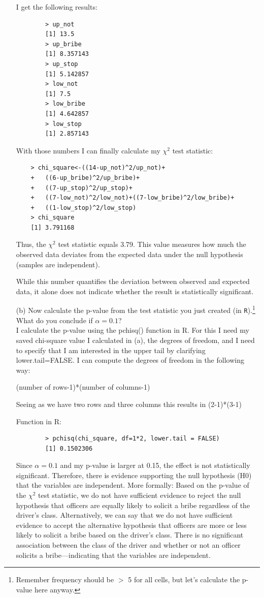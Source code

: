 \documentclass[12pt,letterpaper]{article}
\begin{document}
\begin{enumerate}
	I get the following results: 
	\begin{verbatim}
		> up_not
		[1] 13.5
		> up_bribe
		[1] 8.357143
		> up_stop
		[1] 5.142857
		> low_not
		[1] 7.5
		> low_bribe
		[1] 4.642857
		> low_stop
		[1] 2.857143
		\end{verbatim}
	
	With those numbers I can finally calculate my $\chi^2$ test statistic:
	\begin{verbatim}	
	> chi_square<-((14-up_not)^2/up_not)+
	+   ((6-up_bribe)^2/up_bribe)+
	+   ((7-up_stop)^2/up_stop)+
	+   ((7-low_not)^2/low_not)+((7-low_bribe)^2/low_bribe)+
	+   ((1-low_stop)^2/low_stop)
	> chi_square
	[1] 3.791168
		\end{verbatim}
	
	Thus, the $\chi^2$ test statistic equals 3.79. This value measures how much the observed data deviates from the expected data under the null hypothesis (samples are independent).

While this number quantifies the deviation between observed and expected data, it alone does not indicate whether the result is statistically significant. 
	
	\item [(b)]
	Now calculate the p-value from the test statistic you just created (in \texttt{R}).\footnote{Remember frequency should be $>$ 5 for all cells, but let's calculate the p-value here anyway.}  What do you conclude if $\alpha = 0.1$?\\
	
	I calculate the p-value using the pchisq() function in R. For this I need my saved chi-square value I calculated in (a), the degrees of freedom, and I need to specify that I am interested in the upper tail by clarifying lower.tail=FALSE. I can compute the degrees of freedom in the following way: 
	
	(number of rows-1)*(number of columns-1)
	
	Seeing as we have two rows and three columns this results in (2-1)*(3-1)
	
	Function in R:
	\begin{verbatim}	
		> pchisq(chi_square, df=1*2, lower.tail = FALSE)
		[1] 0.1502306
	\end{verbatim}
	
	Since $\alpha = 0.1$ and my p-value is larger at 0.15, the effect is not statistically significant. Therefore, there is evidence supporting the null hypothesis (H0) that the variables are independent.
	More formally: Based on the p-value of the $\chi^2$ test statistic, we do not have sufficient evidence to reject the null hypothesis that officers are equally likely to solicit a bribe regardless of the driver's class.
	Alternatively, we can say that we do not have sufficient evidence to accept the alternative hypothesis that officers are more or less likely to solicit a bribe based on the driver's class.
	There is no significant association between the class of the driver and whether or not an officer solicits a bribe—indicating that the variables are independent.
	

\end{enumerate}
\end{document}
